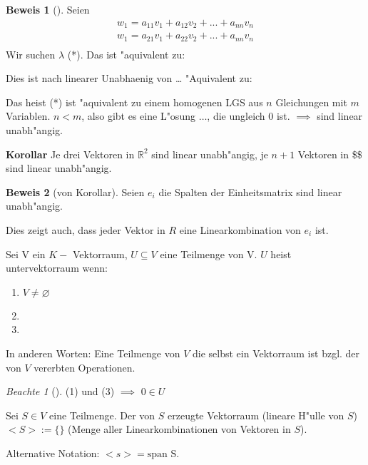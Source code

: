 \documentclass[11pt]{article}
\theoremstyle{remark}
\newtheorem*{notte}{Beachte}
\theoremstyle{definition}
\newtheorem{prof}{Beweis}
\theoremstyle{remark}
\begin{document}
\begin{prof}[] \label{}
Seien 
\begin{align*}
w_1= a_{11} v_1 + a_{12} v_2 + ... + a_{nn} v_n \\
w_1= a_{21} v_1 + a_{22} v_2 + ... + a_{nn} v_n \\
\end{align*}
Wir suchen \(\lambda\) (*). Das ist "aquivalent zu:

Dies ist nach linearer Unabhaenig von \ldots{} "Aquivalent zu:

Das heist (*) ist "aquivalent zu einem homogenen LGS aus \(n\) Gleichungen mit \(m\)
Variablen. \(n<m\), also gibt es eine L"osung $\ldots{}$, die ungleich \(0\) ist. \(\implies\)
sind linear unabh"angig.
\end{prof}

\textbf{Korollar} Je drei Vektoren in \(\mathbb{R}^2\) sind linear unabh"angig, je \(n+1\)
Vektoren in \$\$ sind linear unabh"angig.

\begin{prof}[von Korollar] \label{}
Seien \(e_i\) die Spalten der Einheitsmatrix sind linear unabh"angig. 

Dies zeigt auch, dass jeder Vektor in \(R\) eine Linearkombination von \(e_i\) ist. 
\end{prof}

\begin{definition}{}{}
Sei V ein \(K-\) Vektorraum, \(U\subseteq V\) eine Teilmenge von V. \(U\) heist
untervektorraum wenn:
\begin{enumerate}
\item \(V\not= \varnothing\)
\item 

\item 
\end{enumerate}

In anderen Worten: Eine Teilmenge von \(V\) die selbst ein Vektorraum ist bzgl.
der von \(V\) vererbten Operationen.
\end{definition}

\begin{notte}[] \label{}
(1) und (3) \(\implies\) \(0\in U\)
\end{notte}

\begin{definition}{}{}
Sei \(S \in V\) eine Teilmenge. Der von \(S\) erzeugte Vektorraum (lineare H"ulle
von \(S\)) \(<S>:=\{\}\) (Menge aller Linearkombinationen von Vektoren in \(S\)).

Alternative Notation: \(<s>=\text{span S}\).
\end{definition}
\end{document}

